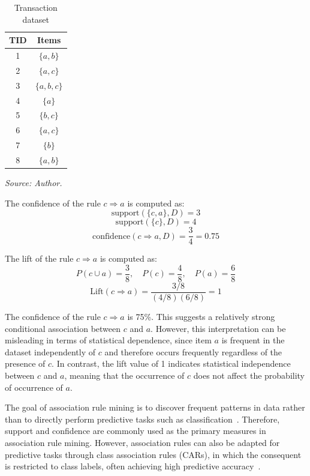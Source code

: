\begin{table}[h!]
\centering
\caption{Transaction dataset}
\label{tab:dataset}
\begin{threeparttable}
\begin{tabular}{|c|c|}
\hline
\textbf{TID} & \textbf{Items} \\
\hline
1 & $\{a, b\}$ \\
2 & $\{a, c\}$ \\
3 & $\{a, b, c\}$ \\
4 & $\{a\}$ \\
5 & $\{b, c\}$ \\
6 & $\{a, c\}$ \\
7 & $\{b\}$ \\
8 & $\{a, b\}$ \\
\hline
\end{tabular}
\begingroup
\let\item\relax
\item \textit{Source: Author.}
\endgroup
\end{threeparttable}
\end{table}

The confidence of the rule $c \Rightarrow a$ is computed as:
\[
\text{support}(\{c, a\}, D) = 3
\]
\[
\text{support}(\{c\}, D) = 4
\]
\[
\text{confidence}(c \Rightarrow a, D) = \frac{3}{4} = 0.75
\]

The lift of the rule $c \Rightarrow a$ is computed as:
\[
P(c \cup a) = \frac{3}{8}, \quad P(c) = \frac{4}{8}, \quad P(a) = \frac{6}{8}
\]
\[
\text{Lift}(c \Rightarrow a) = \frac{3/8}{(4/8)(6/8)} = 1
\]

The confidence of the rule $c \Rightarrow a$ is 75\%. This suggests a relatively strong conditional association between $c$ and $a$. However, this interpretation can be misleading in terms of statistical dependence, since item $a$ is frequent in the dataset independently of $c$ and therefore occurs frequently regardless of the presence of $c$. In contrast, the lift value of 1 indicates statistical independence between $c$ and $a$, meaning that the occurrence of $c$ does not affect the probability of occurrence of $a$.

The goal of association rule mining is to discover frequent patterns in data rather than to directly perform predictive tasks such as classification~\parencite{Han2012}. Therefore, support and confidence are commonly used as the primary measures in association rule mining. However, association rules can also be adapted for predictive tasks through class association rules (CARs), in which the consequent is restricted to class labels, often achieving high predictive accuracy~\parencite{liu1998integrating}.

